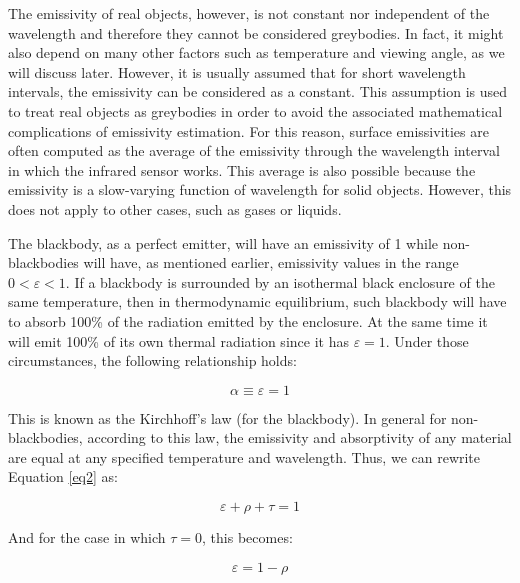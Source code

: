 		\bigskip
		The emissivity of real objects, however, is not constant nor independent of the wavelength and therefore they cannot be considered greybodies. In fact, it might also depend on many other factors such as temperature and viewing angle, as we will discuss later. However, it is usually assumed that for short wavelength intervals, the emissivity can be considered as a constant. This assumption is used to treat real objects as greybodies in order to avoid the associated mathematical complications of emissivity estimation. For this reason, surface emissivities are often computed as the average of the emissivity through the wavelength interval in which the infrared sensor works. This average is also possible because the emissivity is a slow-varying function of wavelength for solid objects. However, this does not apply to other cases, such as gases or liquids.
		
		The blackbody, as a perfect emitter, will have an emissivity of 1 while non-blackbodies will have, as mentioned earlier, emissivity values in the range $0<\varepsilon<1$. If a blackbody is surrounded by an isothermal black enclosure of the same temperature, then in thermodynamic equilibrium, such blackbody will have to absorb 100\% of the radiation emitted by the enclosure. At the same time it will emit 100\% of its own thermal radiation since it has $\varepsilon=1$. Under those circumstances, the following relationship holds:
		
		\begin{equation}\label{eq5}
			\alpha \equiv \varepsilon=1
		\end{equation}	
		
		This is known as the Kirchhoff's law (for the blackbody). In general for non-blackbodies, according to this law, the emissivity and absorptivity of any material are equal at any specified temperature and wavelength. Thus, we can rewrite Equation \ref{eq2} as:	
		
		\begin{equation}\label{eq6}
			\varepsilon + \rho + \tau = 1
		\end{equation}	
		
		And for the case in which $\tau=0$, this becomes:
		
		\begin{equation}\label{eq7}
			\varepsilon = 1 - \rho
		\end{equation}	
		
		
			